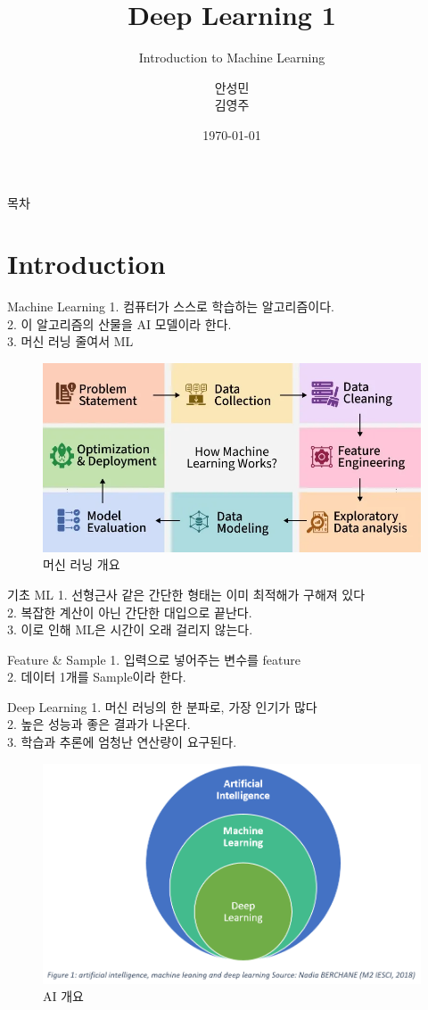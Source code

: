 \documentclass{beamer}
\title{Deep Learning 1}
\subtitle{Introduction to Machine Learning}
\author{안성민\\ 김영주}
\date{\today}
\begin{document}
\maketitle

\begin{frame}{목차}
  \tableofcontents
\end{frame}

\section{Introduction}
\begin{frame}{Machine Learning}
    1. 컴퓨터가 스스로 학습하는 알고리즘이다.\\
    2. 이 알고리즘의 산물을 AI 모델이라 한다.\\
    3. 머신 러닝 줄여서 ML\\
    \begin{figure}
        \centering
        \includegraphics[width=0.5\linewidth]{Images/Machine Learning.png}
        \caption{머신 러닝 개요}
        \label{fig:ML}
    \end{figure}
\end{frame}
\begin{frame}{기초 ML}
    1. 선형근사 같은 간단한 형태는 이미 최적해가 구해져 있다\\
    2. 복잡한 계산이 아닌 간단한 대입으로 끝난다.\\
    3. 이로 인해 ML은 시간이 오래 걸리지 않는다.
    
\end{frame}
\begin{frame}{Feature \& Sample}
    1. 입력으로 넣어주는 변수를 feature\\
    2. 데이터 1개를 Sample이라 한다. 
\end{frame}

\begin{frame}{Deep Learning}
    1. 머신 러닝의 한 분파로, 가장 인기가 많다\\
    2. 높은 성능과 좋은 결과가 나온다.\\
    3. 학습과 추론에 엄청난 연산량이 요구된다.
    \begin{figure}
        \centering
        \includegraphics[width=0.5\linewidth]{Images/AI.png}
        \caption{AI 개요}
        \label{fig:AI}
    \end{figure}
\end{frame}
\end{document}
